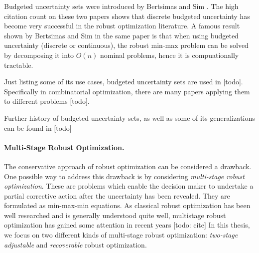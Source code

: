 Budgeted uncertainty sets were introduced by Bertsimas and Sim \cite{bertsimas2003robust,bertsimas2004price}. 
The high citation count on these two papers shows that discrete budgeted uncertainty has become very successful in the robust optimization literature. 
A famous result shown by Bertsimas and Sim in the same paper is that when using budgeted uncertainty (discrete or continuous), the robust min-max problem can be solved by decomposing it into $O(n)$ nominal problems, hence it is compuationally tractable.

Just listing some of its use cases, budgeted uncertainty sets are used in [todo]. Specifically in combinatorial optimization, there are many papers applying them to different problems [todo].

Further history of budgeted uncertainty sets, as well as some of its generalizations can be found in [todo]

\paragraph*{Multi-Stage Robust Optimization.}
The conservative approach of robust optimization can be considered a drawback. One possible way to address this drawback is by considering \emph{multi-stage robust optimization}. 
These are problems which enable the decision maker to undertake a partial corrective action after the uncertainty has been revealed. They are formulated as min-max-min equations.
As classical robust optimization has been well researched and is generally understood quite well, multistage robust optimization has gained some attention in recent years [todo: cite] In this thesis, we focus on two different kinds of multi-stage robust optimization:  \emph{two-stage adjustable} and \emph{recoverable} robust optimization.

